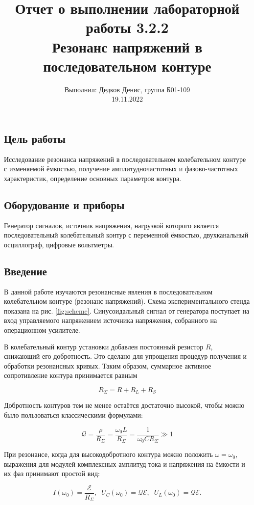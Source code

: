 \documentclass[12pt,a4paper]{article}
\author{\normalsize Выполнил: Дедков Денис, группа Б01-109 \\
	\normalsize 19.11.2022}
\date{}
\title{
	\large Отчет о выполнении лабораторной работы 3.2.2 \\
	\Large Резонанс напряжений в последовательном контуре \\ 
	
}
\begin{document}
\maketitle
\subsection*{Цель работы} Исследование резонанса напряжений в последовательном
колебательном контуре с изменяемой ёмкостью, получение амплитудночастотных и фазово-частотных характеристик, определение основных параметров контура.
\subsection*{Оборудование и приборы} Генератор сигналов, источник напряжения,
нагрузкой которого является последовательный колебательный контур с
переменной ёмкостью, двухканальный осциллограф, цифровые вольтметры.

\subsection*{Введение}

В данной работе изучаются резонансные явления в последовательном колебательном контуре (резонанс напряжений). Схема экспериментального стенда показана на рис. \ref{fig:scheme}. Синусоидальный сигнал от генератора поступает на вход управляемого напряжением источника напряжения, собранного на операционном усилителе.

В колебательный контур установки добавлен постоянный резистор $R$, снижающий его
добротность. Это сделано для упрощения процедур получения и обработки резонансных кривых. Таким образом, суммарное активное сопротивление контура принимается равным

$$R_{\Sigma} = R + R_L + R_S$$

Добротность контуров тем не менее остаётся достаточно высокой, чтобы
можно было пользоваться классическими формулами:

$$\mathcal{Q} = \frac{\rho}{R_{\Sigma}} = \frac{\omega_0 L}{R_{\Sigma}} 
= \frac{1}{\omega_0 C R_{\Sigma}} \gg 1$$

При резонансе, когда для высокодобротного контура можно положить $\omega = \omega_0$, выражения для модулей комплексных амплитуд тока и напряжения на ёмкости и их фаз принимают простой вид:

$$I(\omega_0) = \frac{\mathscr{E}}{R_{\Sigma}},\;\; U_C(\omega_0) = \mathcal{Q} \mathscr{E}, \;\; U_L(\omega_0) = \mathcal{Q} \mathscr{E}.$$
\end{document}
